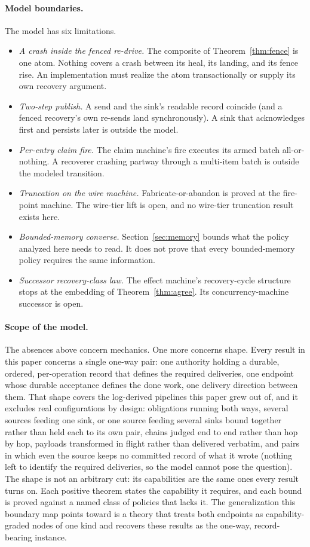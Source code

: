 \documentclass[sigplan,10pt]{acmart}
\theoremstyle{plain}
\theoremstyle{definition}
\begin{document}
\paragraph{Model boundaries.}
The model has six limitations.
\begin{itemize}
\item \emph{A crash inside the fenced re-drive.} The composite of
  Theorem~\ref{thm:fence} is one atom. Nothing covers a crash between
  its heal, its landing, and its fence rise. An implementation must
  realize the atom transactionally or supply its own recovery
  argument.
\item \emph{Two-step publish.} A send and the sink's readable record
  coincide (and a fenced recovery's own re-sends land synchronously).
  A sink that acknowledges first and persists later is outside the
  model.
\item \emph{Per-entry claim fire.} The claim machine's fire executes
  its armed batch all-or-nothing. A recoverer crashing partway
  through a multi-item batch is outside the modeled transition.
\item \emph{Truncation on the wire machine.} Fabricate-or-abandon is
  proved at the fire-point machine. The wire-tier lift is open, and
  no wire-tier truncation result exists here.
\item \emph{Bounded-memory converse.} Section~\ref{sec:memory} bounds
  what the policy analyzed here needs to read. It does not prove that every
  bounded-memory policy requires the same information.
\item \emph{Successor recovery-class law.} The effect machine's
  recovery-cycle structure stops at the embedding of
  Theorem~\ref{thm:agree}. Its concurrency-machine successor is open.
\end{itemize}

\paragraph{Scope of the model.}
The absences above concern mechanics. One more concerns shape. Every
result in
this paper concerns a single one-way pair: one authority holding a
durable, ordered, per-operation record that defines the required deliveries, one
endpoint whose durable acceptance defines the done work, one delivery
direction between them. That shape covers the log-derived pipelines
this paper grew out of, and it excludes real configurations by design:
obligations running both ways, several sources feeding one sink, or
one source feeding several sinks bound together rather than held each
to its own pair, chains judged end to end rather than hop by hop,
payloads transformed in flight rather than delivered verbatim, and
pairs in which even the source keeps no committed record of what it
wrote (nothing left to identify the required deliveries, so the model cannot pose
the question). The shape is not an arbitrary cut: its capabilities are
the same ones every result turns on. Each positive theorem states the capability it requires, and each bound
is proved against a named class of policies that lacks it. The generalization this boundary map points toward is a theory that
treats both endpoints as capability-graded nodes of one kind and
recovers these results as the one-way, record-bearing instance.
\end{document}

